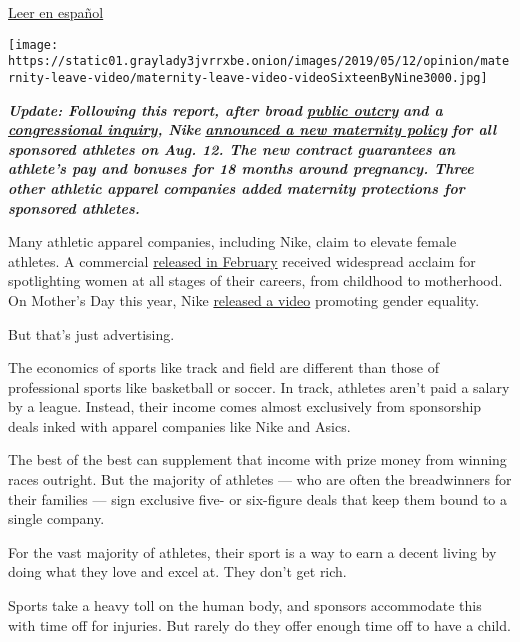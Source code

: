 \href{https://www.nytimes3xbfgragh.onion/es/2019/05/14/nike-patrocinio-mujeres/}{Leer
en español}

\texttt{[image: https://static01.graylady3jvrrxbe.onion/images/2019/05/12/opinion/maternity-leave-video/maternity-leave-video-videoSixteenByNine3000.jpg]}

\emph{\textbf{Update: Following this report, after broad}}
\textbf{\href{mailto:https://www.si.com/olympics/2019/05/24/nike-maternity-protection-sponsorships-contract-allyson-felix-alysia-montano}{\emph{public
outcry}}} \emph{\textbf{and a}}
\textbf{\href{mailto:https://herrerabeutler.house.gov/uploadedfiles/05_17_19_letter_to_nike.pdf}{\emph{congressional
inquiry}}\emph{, Nike}}
\textbf{\href{https://www.washingtonpost.com/sports/2019/08/16/under-fire-nike-expands-protections-pregnant-athletes/}{\emph{announced
a new maternity policy}}} \emph{\textbf{for all sponsored athletes on
Aug. 12. The new contract guarantees an athlete's pay and bonuses for 18
months around pregnancy. Three other athletic apparel companies added
maternity protections for sponsored athletes.}}

Many athletic apparel companies, including Nike, claim to elevate female
athletes. A commercial
\href{http://thesource.com/2019/02/25/serena-williams-narrates-new-nike-dream-crazier-commercial/}{released
in February} received widespread acclaim for spotlighting women at all
stages of their careers, from childhood to motherhood. On Mother's Day
this year, Nike
\href{https://www.youtube.com/watch?v=IHcWPVbDArU}{released a video}
promoting gender equality.

But that's just advertising.

The economics of sports like track and field are different than those of
professional sports like basketball or soccer. In track, athletes aren't
paid a salary by a league. Instead, their income comes almost
exclusively from sponsorship deals inked with apparel companies like
Nike and Asics.

The best of the best can supplement that income with prize money from
winning races outright. But the majority of athletes --- who are often
the breadwinners for their families --- sign exclusive five- or
six-figure deals that keep them bound to a single company.

For the vast majority of athletes, their sport is a way to earn a decent
living by doing what they love and excel at. They don't get rich.

Sports take a heavy toll on the human body, and sponsors accommodate
this with time off for injuries. But rarely do they offer enough time
off to have a child.

